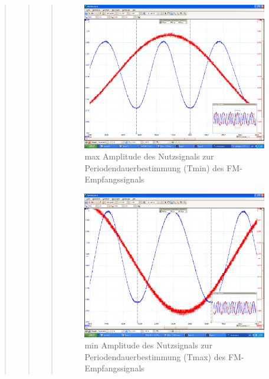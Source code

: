 \begin{quote}
\begin{quote}
\begin{quote}
                    \begin{figure}[H]
                        \label{fig:}                    
                        \includegraphics[scale=0.2, trim = 0cm 1.5cm 0cm
                        2.5cm, clip]{./Bilder/aufgabe_4_12_sinus_high-ampl}
                        \caption{max Amplitude des Nutzsignals zur
                        Periodendauerbestimmung (Tmin) des FM-Empfangssignals}
                    \end{figure}

                     \begin{figure}[H]
                        \label{fig:}
                        \includegraphics[scale=0.2, trim = 0cm 1.5cm 0cm
                        2.5cm, clip]{./Bilder/aufgabe_4_12_sinus_low-ampl}
                        \caption{min Amplitude des Nutzsignals zur
                        Periodendauerbestimmung (Tmax) des FM-Empfangssignals}
                    \end{figure}
                   \vspace{-1.5em}
        

\end{quote}
\end{quote}
\end{quote}
